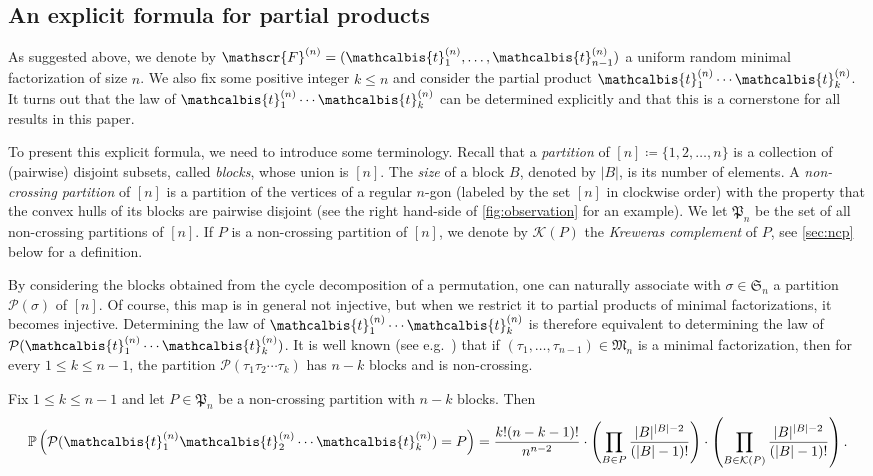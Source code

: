 \documentclass[AHL,XML,longabstracts,Unicode]{cedram}
\def\PPP{\mathcal P}
\def\tb{\mathcalbis{t}}
\renewcommand\Pr[1]{\mathbb{P}\left(#1\right)}
\begin{document}
\subsection{An explicit formula for partial products}
As suggested above, we denote by \hbox{$\mathscr{F}^{(n)}= (\tb_{1}^{(n)}, \ldots, \tb_{n-1}^{(n)})$}
a uniform random minimal factorization of size $n$.
We also fix some positive integer $k \le n$ and consider the partial product
$\tb_{1}^{(n)} \cdots \tb_k^{(n)}$.
It turns out that the law of $\tb_{1}^{(n)} \cdots \tb_k^{(n)}$ can be determined explicitly
and that this is a cornerstone for all results in this paper.

To present this explicit formula, we need to introduce some terminology.
 Recall that a \emph{partition} of $[n] \coloneqq \{1,2, \ldots,n\}$ is a collection of (pairwise) disjoint subsets,
 called \emph{blocks}, whose union is $[n]$.
 The \emph{size} of a block $B$, denoted by $|B|$, is its number of elements.
 A \emph{non-crossing partition} of $[n]$ is a partition of the vertices of a regular $n$-gon (labeled by the set $[n]$ in clockwise order) with the property that the convex hulls of its blocks are pairwise disjoint (see the right hand-side of \cref{fig:observation} for an example).
 We let $ \mathfrak{P}_{n}$ be the set of all non-crossing partitions of $[n]$.
 If $P$ is a non-crossing partition of $[n]$, we denote by $ \mathcal{K}(P)$ the \emph{Kreweras complement} of $P$, see \cref{sec:ncp} below for a definition.

By considering the blocks obtained from the cycle decomposition of a permutation,
one can naturally associate with $\sigma \in \mathfrak{S}_{n}$ a partition $\PPP(\sigma)$ of $[n]$.
Of course, this map is in general  not injective, but when we restrict it to partial products of minimal factorizations,
it becomes injective. Determining the law of $\tb_{1}^{(n)} \cdots \tb_k^{(n)}$ is therefore equivalent to determining
the law of $\PPP(\tb_{1}^{(n)} \cdots \tb_{k}^{(n)})$.
It is well known (see e.g.\ \cite[Theorem 1]{Biane1997}) that if $(\tau_{1}, \ldots, \tau_{n-1})  \in \mathfrak{M}_{n}$ is a minimal factorization, then for every $1 \leq k \leq n-1$,
the partition $\PPP(\tau_{1} \tau_{2} \cdots \tau_{k})$
has $n-k$ blocks and is non-crossing.

\begin{proposition}
\label{prop:lawproduct}Fix $1 \leq k \leq n-1$ and let $P \in \mathfrak{P}_{n}$ be a non-crossing partition with $n-k$ blocks. Then
\[\Pr{\PPP(\tb_{1}^{(n)} \tb_{2}^{(n)} \cdots \tb_{k}^{(n)})=P}= \frac{k! (n-k-1)!}{n^{n-2}}  \cdot  \left( \prod_{B \in P} \frac{|B|^{|B|-2}}{(|B|-1)!} \right) \cdot \left(  \prod_{B \in  \mathcal{K}(P)} \frac{|B|^{|B|-2}}{(|B|-1)!} \right).\]
\end{proposition}
\end{document}
